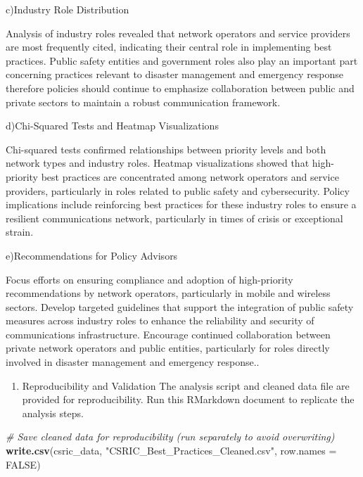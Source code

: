 \documentclass[
]{article}
\newenvironment{Shaded}{\begin{snugshade}}{\end{snugshade}}
\newcommand{\AttributeTok}[1]{\textcolor[rgb]{0.13,0.29,0.53}{#1}}
\newcommand{\CommentTok}[1]{\textcolor[rgb]{0.56,0.35,0.01}{\textit{#1}}}
\newcommand{\ConstantTok}[1]{\textcolor[rgb]{0.56,0.35,0.01}{#1}}
\newcommand{\FunctionTok}[1]{\textcolor[rgb]{0.13,0.29,0.53}{\textbf{#1}}}
\newcommand{\NormalTok}[1]{#1}
\newcommand{\StringTok}[1]{\textcolor[rgb]{0.31,0.60,0.02}{#1}}
\providecommand{\tightlist}{%
  \setlength{\itemsep}{0pt}\setlength{\parskip}{0pt}}
\begin{document}
c)Industry Role Distribution

Analysis of industry roles revealed that network operators and service
providers are most frequently cited, indicating their central role in
implementing best practices. Public safety entities and government roles
also play an important part concerning practices relevant to disaster
management and emergency response therefore policies should continue to
emphasize collaboration between public and private sectors to maintain a
robust communication framework.

d)Chi-Squared Tests and Heatmap Visualizations

Chi-squared tests confirmed relationships between priority levels and
both network types and industry roles. Heatmap visualizations showed
that high-priority best practices are concentrated among network
operators and service providers, particularly in roles related to public
safety and cybersecurity. Policy implications include reinforcing best
practices for these industry roles to ensure a resilient communications
network, particularly in times of crisis or exceptional strain.

e)Recommendations for Policy Advisors

Focus efforts on ensuring compliance and adoption of high-priority
recommendations by network operators, particularly in mobile and
wireless sectors. Develop targeted guidelines that support the
integration of public safety measures across industry roles to enhance
the reliability and security of communications infrastructure. Encourage
continued collaboration between private network operators and public
entities, particularly for roles directly involved in disaster
management and emergency response..

\begin{enumerate}
\def\labelenumi{\arabic{enumi}.}
\setcounter{enumi}{7}
\tightlist
\item
  Reproducibility and Validation The analysis script and cleaned data
  file are provided for reproducibility. Run this RMarkdown document to
  replicate the analysis steps.
\end{enumerate}

\begin{Shaded}
\begin{Highlighting}[]
\CommentTok{\# Save cleaned data for reproducibility (run separately to avoid overwriting)}
\FunctionTok{write.csv}\NormalTok{(csric\_data, }\StringTok{"CSRIC\_Best\_Practices\_Cleaned.csv"}\NormalTok{, }\AttributeTok{row.names =} \ConstantTok{FALSE}\NormalTok{)}
\end{Highlighting}
\end{Shaded}
\end{document}
